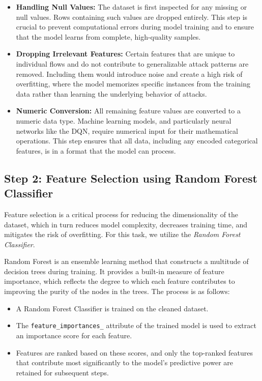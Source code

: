 \documentclass[12pt]{report}
\begin{document}
\begin{itemize}
    \item \textbf{Handling Null Values:} The dataset is first inspected for any missing or null values. Rows containing such values are dropped entirely. This step is crucial to prevent computational errors during model training and to ensure that the model learns from complete, high-quality samples.

    \item \textbf{Dropping Irrelevant Features:} Certain features that are unique to individual flows and do not contribute to generalizable attack patterns are removed. Including them would introduce noise and create a high risk of overfitting, where the model memorizes specific instances from the training data rather than learning the underlying behavior of attacks.

    \item \textbf{Numeric Conversion:} All remaining feature values are converted to a numeric data type. Machine learning models, and particularly neural networks like the DQN, require numerical input for their mathematical operations. This step ensures that all data, including any encoded categorical features, is in a format that the model can process.
\end{itemize}

\subsection{Step 2: Feature Selection using Random Forest Classifier}

Feature selection is a critical process for reducing the dimensionality of the dataset, which in turn reduces model complexity, decreases training time, and mitigates the risk of overfitting. For this task, we utilize the \textit{Random Forest Classifier}.

Random Forest is an ensemble learning method that constructs a multitude of decision trees during training. It provides a built-in measure of feature importance, which reflects the degree to which each feature contributes to improving the purity of the nodes in the trees. The process is as follows:

\begin{itemize}
    \item A Random Forest Classifier is trained on the cleaned dataset.
    
    \item The \texttt{feature\_importances\_} attribute of the trained model is used to extract an importance score for each feature.
    
    \item Features are ranked based on these scores, and only the top-ranked features that contribute most significantly to the model’s predictive power are retained for subsequent steps.
\end{itemize}
\end{document}
